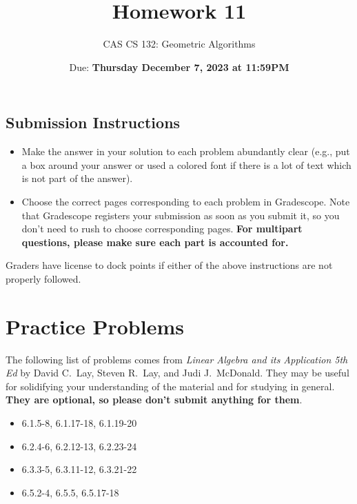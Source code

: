 \documentclass{article}
\title{
  Homework 11
}
\author{CAS CS 132: Geometric Algorithms}
\date{Due: \textbf{Thursday December 7, 2023 at 11:59PM}}
\theoremstyle{remark}
\begin{document}
\maketitle

\subsection*{Submission Instructions}
\begin{itemize}
\item Make the answer in your solution to each problem abundantly clear (e.g., put a box around your answer or used a colored font if there is a lot of text which is not part of the answer).
\item Choose the correct pages corresponding to each problem in Gradescope. Note that Gradescope registers your submission as soon as you submit it, so you don't need to rush to choose corresponding pages.
  \textbf{For multipart questions, please make sure each part is accounted for.}
\end{itemize}
Graders have license to dock points if either of the above instructions are not properly followed.


\section*{Practice Problems}

The following list of problems comes from \textit{Linear Algebra and its Application 5th Ed} by David C.\ Lay, Steven R.\ Lay, and Judi J.\ McDonald.
They may be useful for solidifying your understanding of the material and for studying in general.
\textbf{They are optional, so please don't submit anything for them}.

\begin{itemize}
\item 6.1.5-8, 6.1.17-18, 6.1.19-20
\item 6.2.4-6, 6.2.12-13, 6.2.23-24
\item 6.3.3-5, 6.3.11-12, 6.3.21-22
\item 6.5.2-4, 6.5.5, 6.5.17-18
\end{itemize}

\pagebreak
\end{document}
